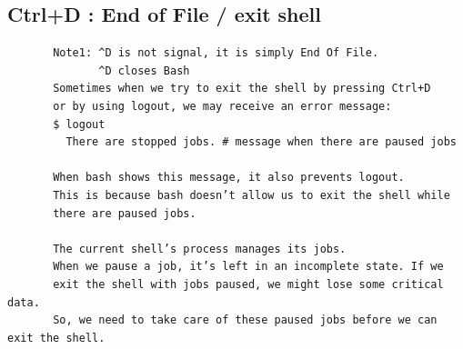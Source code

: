 \documentclass[a4paper,12pt]{article}
\begin{document}
\subsection{Ctrl+D     : End of File / exit shell  }
\begin{verbatim}
       Note1: ^D is not signal, it is simply End Of File.
              ^D closes Bash
       Sometimes when we try to exit the shell by pressing Ctrl+D
       or by using logout, we may receive an error message:
       $ logout
         There are stopped jobs. # message when there are paused jobs
       
       When bash shows this message, it also prevents logout.
       This is because bash doesn’t allow us to exit the shell while
       there are paused jobs.
       
       The current shell’s process manages its jobs. 
       When we pause a job, it’s left in an incomplete state. If we 
       exit the shell with jobs paused, we might lose some critical data.
       So, we need to take care of these paused jobs before we can exit the shell.

\end{verbatim}
\end{document}
